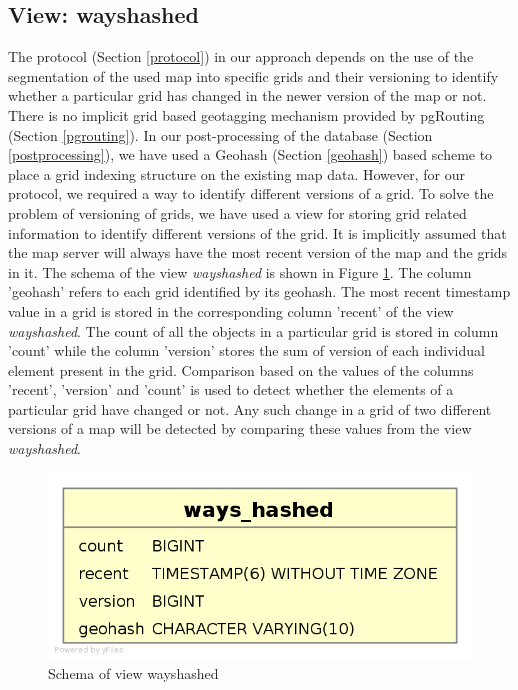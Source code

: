 \subsection{View: wayshashed}
The protocol (Section \ref{protocol}) in our approach depends on the use of the segmentation of the used map into specific grids and their versioning to identify whether a particular grid has changed in the newer version of the map or not. There is no implicit grid based geotagging mechanism provided by pgRouting (Section \ref{pgrouting}). In our post-processing of the database (Section \ref{postprocessing}), we have used a Geohash (Section \ref{geohash}) based scheme to place a grid indexing structure on the existing map data. However, for our protocol, we required a way to identify different versions of a grid. To solve the problem of versioning of grids, we have used a view for storing grid related information to identify different versions of the grid. It is implicitly assumed that the map server will always have the most recent version of the map and the grids in it. The schema of the view \textit{wayshashed} is shown in Figure \ref{fg:wayshashed}. The column 'geohash' refers to each grid identified by its geohash. The most recent timestamp value in a grid is stored in the corresponding column 'recent' of the view \textit{wayshashed}. The count of all the objects in a particular grid is stored in column 'count' while the column 'version' stores the sum of version of each individual element present in the grid. Comparison based on the values of the columns 'recent', 'version' and 'count' is used to detect whether the elements of a particular grid have changed or not. Any such change in a grid of two different versions of a map will be detected by comparing these values from the view \textit{wayshashed}.
\begin{figure}
\includegraphics[scale=.3]{wayshashed.png}
\caption{Schema of view wayshashed}
\label{fg:wayshashed}
\end{figure}



